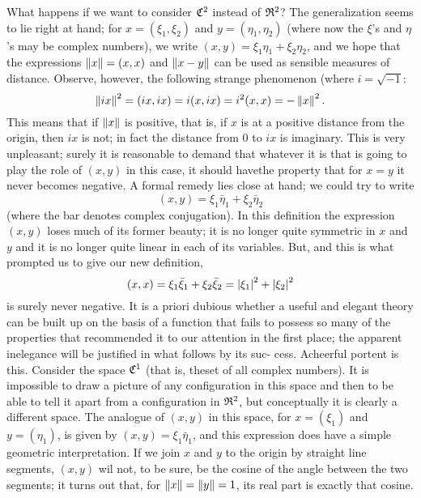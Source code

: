 What happens if we want to consider \(\mathfrak{C}^2\) instead of \(\mathfrak{R}^2\)? The
generalization seems to lie right at hand; for \(x = (\xi_1, \xi_2)\) and \(y =
(\eta_1, \eta_2)\) (where now the \(\xi\)'s and \(\eta\)'s may be complex
numbers), we write \((x, y) = \xi_1\eta_1 + \xi_2\eta_2\), and we hope that the
expressions \(\left\lVert x\right\rVert = (x, x)\) and \(\left\lVert x -y\right\rVert\) can be used as sensible
measures of distance. Observe, however, the following strange phenomenon (where
\(i = \sqrt{-1}\):
\begin{equation*}
    \left\lVert ix\right\rVert^2 = (ix, ix) = i(x, ix) = i^2(x, x) = - \left\lVert x\right\rVert^2.
\end{equation*}
This means that if \(\left\lVert x\right\rVert\) is positive, that is, if \(x\) is at a positive
distance from the origin, then \(ix\) is not; in fact the distance from \(0\) to
\(ix\) is imaginary. This is very unpleasant; surely it is reasonable to demand
that whatever it is that is going to play the role of \((x, y)\) in this case,
it should havethe property that for \(x = y\) it never becomes negative. A
formal remedy lies close at hand; we could try to write
\begin{equation*}
    (x, y) = \xi_1\bar{\eta}_1 + \xi_2\bar{\eta}_2
\end{equation*}
(where the bar denotes complex conjugation). In this definition the expression
\((x, y)\) loses much of its former beauty; it is no longer quite symmetric in
\(x\) and \(y\) and it is no longer quite linear in each of its variables. But,
and this is what prompted us to give our new definition,
\begin{equation*}
    (x, x) = \xi_1\bar{\xi}_1 + \xi_2\bar{\xi}_2 = \left\lvert\xi_1\right\rvert^2 + \left\lvert\xi_2\right\rvert^2
\end{equation*}
is surely never negative. It is a priori dubious whether a useful and elegant
theory can be built up on the basis of a function that fails to possess so many
of the properties that recommended it to our attention in the first place; the
apparent inelegance will be justified in what follows by its suc- cess.
Acheerful portent is this. Consider the space \(\mathfrak{C}^1\) (that is, theset of
all complex numbers). It is impossible to draw a picture of any configuration in
this space and then to be able to tell it apart from a configuration in
\(\mathfrak{R}^2\), but conceptually it is clearly a different space. The analogue of
\((x, y)\) in this space, for \(x = (\xi_1)\) and \(y = (\eta_1)\), is given by
\((x, y) = \xi_1\bar{\eta}_1\), and this expression does have a simple geometric
interpretation. If we join \(x\) and \(y\) to the origin by straight line
segments, \((x, y)\) wil not, to be sure, be the cosine of the angle between the
two segments; it turns out that, for \(\left\lVert x\right\rVert = \left\lVert y\right\rVert = 1\), its real part
is exactly that cosine.

